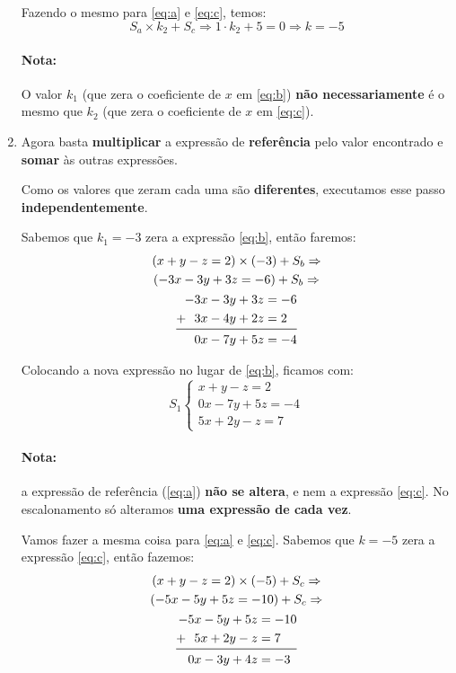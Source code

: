 \begin{enumerate}
    Fazendo o mesmo para \ref{eq:a} e \ref{eq:c}, temos:
    $$
    S_a\times k_2+S_c \Rightarrow 1\cdot k_2+5=0 \Rightarrow k=-5
    $$
    
    \paragraph{Nota:}
    O valor $k_1$ (que zera o coeficiente de $x$ em \ref{eq:b}) \textbf{não necessariamente} é o mesmo que $k_2$ (que zera o coeficiente de $x$ em \ref{eq:c}).
    
    \item Agora basta \textbf{multiplicar} a expressão de \textbf{referência} pelo valor encontrado e \textbf{somar} às outras expressões. 
    
    Como os valores que zeram cada uma são \textbf{diferentes}, executamos esse passo \textbf{independentemente}.
    
    Sabemos que $k_1=-3$ zera a expressão \ref{eq:b}, então faremos:
    \begin{gather*}
        (x+y-z=2)\times (-3) +S_b\Rightarrow\\
        (-3x-3y+3z=-6) + S_b\Rightarrow\\
        \begin{aligned}
        -3x-3y+3z&=-6\\
        \mathbf{+}~~3x-4y+2z&=2\\\midrule
         0x-7y+5z&=-4
        \end{aligned}
    \end{gather*}
    
    Colocando a nova expressão no lugar de \ref{eq:b}, ficamos com:
    $$
    S_1\begin{cases}
    x+y-z=2\\
    0x-7y+5z=-4\\
    5x+2y-z=7
    \end{cases}
    $$
    
    \paragraph{Nota:} 
    a expressão de referência (\ref{eq:a}) \textbf{não se altera}, e nem a expressão \ref{eq:c}. No escalonamento só alteramos \textbf{uma expressão de cada vez}.
    
    Vamos fazer a mesma coisa para \ref{eq:a} e \ref{eq:c}. Sabemos que $k=-5$ zera a expressão \ref{eq:c}, então fazemos:
    \begin{gather*}
        (x+y-z=2) \times (-5) + S_c\Rightarrow\\
        (-5x-5y+5z=-10) + S_c\Rightarrow\\
        \begin{aligned}
        -5x-5y+5z&=-10\\
        \mathbf{+}~~5x+2y-z&=7\\\midrule
        0x-3y+4z&=-3
        \end{aligned}
    \end{gather*}
    

\end{enumerate}
